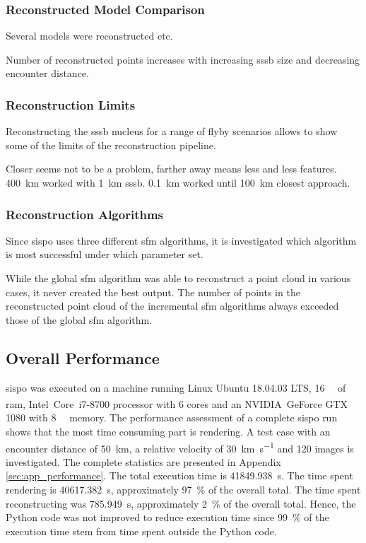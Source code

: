 \subsubsection{Reconstructed Model Comparison}
Several models were reconstructed etc.

Number of reconstructed points increases with increasing \gls{sssb} size and decreasing encounter distance.


\subsubsection{Reconstruction Limits}
Reconstructing the \gls{sssb} nucleus for a range of flyby scenarios allows to show some of the limits of the reconstruction pipeline.

Closer seems not to be a problem, farther away means less and less features. \SI{400}{\kilo\meter} worked with \SI{1}{\kilo\meter} \gls{sssb}. 
\SI{0.1}{\kilo\meter} worked until \SI{100}{\kilo\meter} closest approach.


\subsubsection{Reconstruction Algorithms}
Since \gls{sispo} uses three different \gls{sfm} algorithms, it is investigated which algorithm is most successful under which parameter set.

While the global \gls{sfm} algorithm was able to reconstruct a point cloud in various cases, it never created the best output. The number of points in the reconstructed point cloud of the incremental \gls{sfm} algorithms always exceeded those of the global \gls{sfm} algorithm.

\subsection{Overall Performance}
\gls{sispo} was executed on a machine running Linux Ubuntu 18.04.03 LTS, \SI{16}{\giga\byte} of \gls{ram}, Intel\textsuperscript{\textregistered}~Core\texttrademark~i7-8700 processor with \SI{6}{} cores and an NVIDIA\textsuperscript{\textregistered}~GeForce GTX 1080 with \SI{8}{\giga\byte} memory. The performance assessment of a complete \gls{sispo} run shows that the most time consuming part is rendering. 
A test case with an encounter distance of \SI{50}{\kilo\meter}, a relative velocity of \SI{30}{\kilo\meter\per\second} and \SI{120}{} images is investigated. The complete statistics are presented in Appendix \ref{sec:app_performance}. The total execution time is \SI{41849.938}{\second}. The time spent rendering is \SI{40617.382}{\second}, approximately \SI{97}{\percent} of the overall total. The time spent reconstructing was \SI{785.949}{\second}, approximately \SI{2}{\percent} of the overall total. Hence, the Python code was not improved to reduce execution time since \SI{99}{\percent} of the execution time stem from time spent outside the Python code.